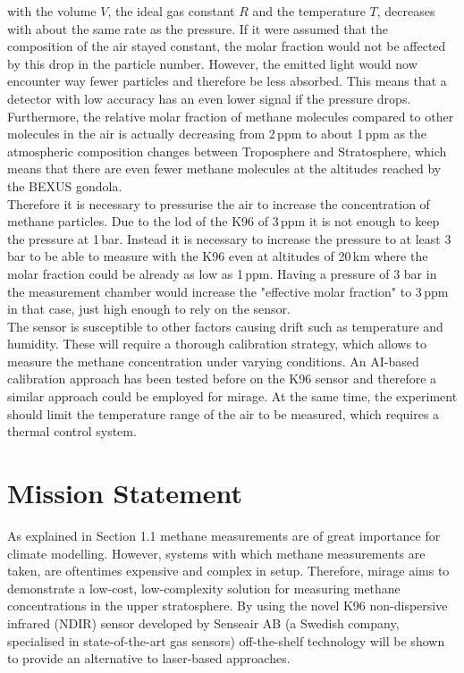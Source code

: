 with the volume $V$, the ideal gas constant $R$ and the temperature $T$, decreases with about the same rate as the pressure. If it were assumed that the composition of the air stayed constant, the molar fraction would not be affected by this drop in the particle number. However, the emitted light would now encounter way fewer particles and therefore be less absorbed. This means that a detector with low accuracy has an even lower signal if the pressure drops. Furthermore, the relative molar fraction of methane molecules compared to other molecules in the air is actually decreasing from 2\,ppm to about 1\,ppm as the atmospheric composition changes between Troposphere and Stratosphere, which means that there are even fewer methane molecules at the altitudes reached by the BEXUS gondola.\\
Therefore it is necessary to pressurise the air to increase the concentration of methane particles. Due to the \gls{lod} of the K96 of 3\,ppm it is not enough to keep the pressure at 1\,bar. Instead it is necessary to increase the pressure to at least 3\,bar to be able to measure with the K96 even at altitudes of 20\,km where the molar fraction could be already as low as 1\,ppm. Having a pressure of 3 bar in the measurement chamber would increase the "effective molar fraction" to 3\,ppm in that case, just high enough to rely on the sensor. \\
The sensor is susceptible to other factors causing drift such as temperature and humidity. These will require a thorough calibration strategy, which allows to measure the methane concentration under varying conditions. An AI-based calibration approach has been tested before on the K96 sensor\cite{gia_accurate_2025} and therefore a similar approach could be employed for \gls{mirage}. At the same time, the experiment should limit the temperature range of the air to be measured, which requires a thermal control system.\\



\section{Mission Statement}

As explained in Section 1.1 methane measurements are of great importance for climate modelling.
However, systems with which methane measurements are taken, are oftentimes expensive and complex in setup.
Therefore, \gls{mirage} aims to demonstrate a low-cost, low-complexity solution for measuring methane concentrations in the upper stratosphere.
By using the novel K96 non-dispersive infrared (NDIR) sensor developed by Senseair AB (a Swedish company, specialised in state-of-the-art gas sensors) \cite{wastine2022} off-the-shelf technology will be shown to provide an alternative to laser-based approaches.

